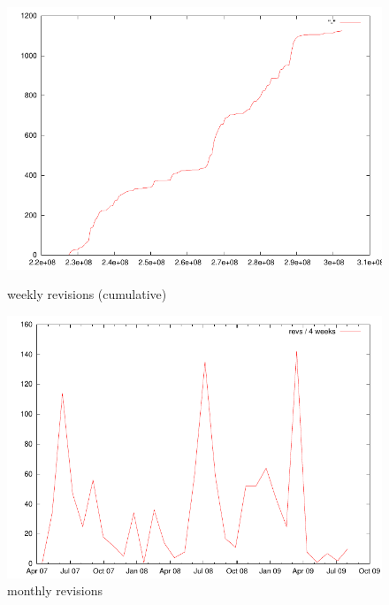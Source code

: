 \documentclass[a4paper]{scrartcl}
\begin{document}
\begin{figure}
  \parbox[b]{.5\textwidth}{%
  \includegraphics[width=\linewidth]{gp_revtr}
  \caption{weekly revisions (cumulative)}
  \label{fig:gp_revtr}}
  \parbox[b]{.5\textwidth}{%
  \includegraphics[width=\linewidth]{gp_revtr2}
  \caption{monthly revisions}
  \label{fig:gp_revtr2}}
\end{figure}
\end{document}
